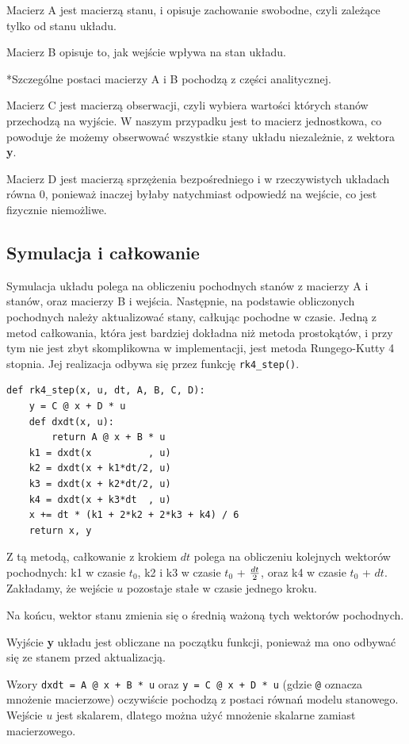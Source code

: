 \documentclass[a4paper,12pt]{article}
\begin{document}
Macierz A jest macierzą stanu, i opisuje zachowanie swobodne, czyli zależące tylko od stanu układu.

Macierz B opisuje to, jak wejście wpływa na stan układu.

*Szczególne postaci macierzy A i B pochodzą z części analitycznej.

Macierz C jest macierzą obserwacji, czyli wybiera wartości których stanów przechodzą na wyjście.
W naszym przypadku jest to macierz jednostkowa, co powoduje że możemy obserwować wszystkie stany układu niezależnie, z wektora \textbf{y}.

Macierz D jest macierzą sprzężenia bezpośredniego i w rzeczywistych układach równa 0, ponieważ inaczej byłaby natychmiast odpowiedź na wejście, co jest fizycznie niemożliwe.

\newpage
\subsection{Symulacja i całkowanie}
Symulacja układu polega na obliczeniu pochodnych stanów z macierzy A i stanów, oraz macierzy B i wejścia.
Następnie, na podstawie obliczonych pochodnych należy aktualizować stany, całkując pochodne w czasie.
Jedną z metod całkowania, która jest bardziej dokładna niż metoda prostokątów, i przy tym nie jest zbyt skomplikowna w implementacji, jest metoda Rungego-Kutty 4 stopnia.
Jej realizacja odbywa się przez funkcję \texttt{rk4\_step()}.
\begin{lstlisting}
def rk4_step(x, u, dt, A, B, C, D):
    y = C @ x + D * u
    def dxdt(x, u):
        return A @ x + B * u
    k1 = dxdt(x          , u)
    k2 = dxdt(x + k1*dt/2, u)
    k3 = dxdt(x + k2*dt/2, u)
    k4 = dxdt(x + k3*dt  , u)
    x += dt * (k1 + 2*k2 + 2*k3 + k4) / 6
    return x, y
\end{lstlisting}
Z tą metodą, całkowanie z krokiem $dt$ polega na obliczeniu kolejnych wektorów pochodnych: k1 w czasie $t_0$, k2 i k3 w czasie $t_0$ + $dt \over 2$, oraz k4 w czasie $t_0$ + $dt$.
Zakładamy, że wejście $u$ pozostaje stałe w czasie jednego kroku.

Na końcu, wektor stanu zmienia się o średnią ważoną tych wektorów pochodnych.

Wyjście \textbf{y} układu jest obliczane na początku funkcji, ponieważ ma ono odbywać się ze stanem przed aktualizacją.

Wzory \texttt{dxdt = A @ x + B * u} oraz \texttt{y = C @ x + D * u} (gdzie \texttt{@} oznacza mnożenie macierzowe) oczywiście pochodzą z postaci równań modelu stanowego.
Wejście $u$ jest skalarem, dlatego można użyć mnożenie skalarne zamiast macierzowego.
\end{document}
